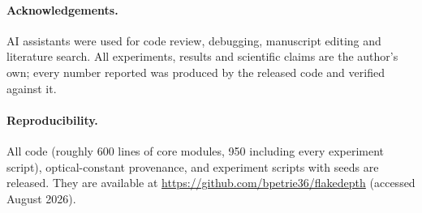 \documentclass[10pt]{article}
\begin{document}
\paragraph{Acknowledgements.} AI assistants were used for code review, debugging, manuscript editing and literature search. All experiments, results and scientific claims are the author's own; every number reported was produced by the released code and verified against it.

\paragraph{Reproducibility.} All code (roughly 600 lines of core modules, 950 including every experiment script), optical-constant provenance, and experiment scripts with seeds are released. They are available at \url{https://github.com/bpetrie36/flakedepth} (accessed August 2026).
\end{document}

